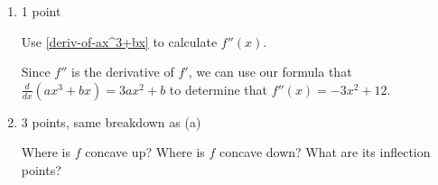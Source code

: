 \documentclass{article}
\begin{document}
\begin{enumerate}
\begin{enumerate}
\begin{solution}
      From this sign chart, we can conclude:
      \begin{itemize}
        \item $f$ is increasing on $(-\infty, -2\sqrt{3})$ and on $(0, 2\sqrt{3})$
        \item $f$ is decreasing on $(-2\sqrt{3}, 0)$ and on $(2\sqrt{3}, \infty)$
        \item $f$ has turning points at $x=0$ and $x=\pm 2\sqrt{3}$
      \end{itemize}
    \end{solution}

  \item

    \begin{grading}
      1 point
    \end{grading}

    \begin{problem}[\stretch{0.25}]
      Use \ref{deriv-of-ax^3+bx} to calculate $f''(x)$.
    \end{problem}

    \begin{solution}
      Since $f''$ is the derivative of $f'$, we can use our formula that $\frac{d}{dx}(ax^3+bx)=3ax^2+b$ 
      to determine that $f''(x) = -3x^2 + 12$. 
    \end{solution}

  \item

    \begin{grading}
      3 points, same breakdown as (a)
    \end{grading}

    \begin{problem}[\vfill]
      Where is $f$ concave up? Where is $f$ concave down? What are its inflection points? 
    \end{problem}


\end{enumerate}
\end{enumerate}
\end{document}
